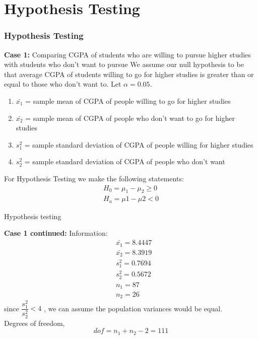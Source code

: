 \documentclass{beamer}
\begin{document}
\section{Hypothesis Testing}
\begin{frame}
    \frametitle{Hypothesis Testing}
    \begin{block}{\textbf{Case 1:}{ Comparing CGPA of students who are willing
                to
                pursue higher studies with students who don't want to pursue
            }}
        We assume our null hypothesis to be that average CGPA of students
        willing
        to go for higher studies is  greater than or equal to those who don't
        want to. Let
        $\alpha =
            0.05$.
        \begin{enumerate}
            \item	$\bar{x_1}$ = sample mean of CGPA of people willing to
                  go for
                  higher studies\\
            \item	$\bar{x_2}$ = sample mean of CGPA of people who  don't
                  want to
                  go for higher studies\\
            \item	$s^2_1$ = sample standard deviation of CGPA of people
                  willing
                  for higher studies\\
            \item	$s^2_2$ = sample standard deviation of CGPA of people
                  who
                  don't want \\
        \end{enumerate}
        For Hypothesis Testing we make the following statements:
        \begin{align}
            H_0=\mu_1-\mu_2\geq0 \\
            H_a=\mu1-\mu2<0
        \end{align}
    \end{block}
\end{frame}

\begin{frame}{Hypothesis testing}
    \begin{block}{\textbf{Case 1 continued:}}
        Information:
        \begin{align}
             & \bar{x_1}=8.4447 \\
             & \bar{x_2}=8.3919 \\
             & s^2_1=0.7694     \\
             & s^2_2=0.5672     \\
             & n_1=87           \\
             & n_2=26
        \end{align}
        since $\dfrac{s^2_1}{s^2_2}<4$ , we can assume the population variances
        would be equal. \\
        Degrees of freedom, $$dof=n_1+n_2-2=111$$
    \end{block}
\end{frame}
\end{document}

